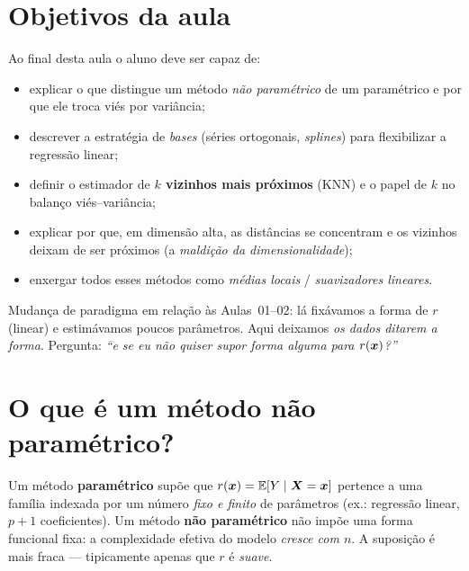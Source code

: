 \documentclass[11pt,a4paper]{article}
\begin{document}

\section*{Objetivos da aula}
Ao final desta aula o aluno deve ser capaz de:
\begin{itemize}[leftmargin=1.4cm]
  \item explicar o que distingue um método \emph{não paramétrico} de um
        paramétrico e por que ele troca viés por variância;
  \item descrever a estratégia de \emph{bases} (séries ortogonais, \emph{splines})
        para flexibilizar a regressão linear;
  \item definir o estimador de \textbf{$k$ vizinhos mais próximos} (KNN) e o papel
        de $k$ no balanço viés--variância;
  \item explicar por que, em dimensão alta, as distâncias se concentram e os vizinhos
        deixam de ser próximos (a \emph{maldição da dimensionalidade});
  \item enxergar todos esses métodos como \emph{médias locais} / \emph{suavizadores
        lineares}.
\end{itemize}

\begin{emsala}
Mudança de paradigma em relação às Aulas~01--02: lá fixávamos a forma de $r$
(linear) e estimávamos poucos parâmetros. Aqui deixamos \emph{os dados ditarem a
forma}. Pergunta: \emph{``e se eu não quiser supor forma alguma para
$r(\bm{x})$?''}
\end{emsala}

\section{O que é um método não paramétrico?}
Um método \textbf{paramétrico} supõe que $r(\bm{x})=\mathbb{E}[Y\mid\bm{X}=\bm{x}]$ pertence a uma
família indexada por um número \emph{fixo e finito} de parâmetros (ex.: regressão
linear, $p+1$ coeficientes). Um método \textbf{não paramétrico} não impõe uma
forma funcional fixa: a complexidade efetiva do modelo \emph{cresce com $n$}. A
suposição é mais fraca --- tipicamente apenas que $r$ é \emph{suave}.
\end{document}
